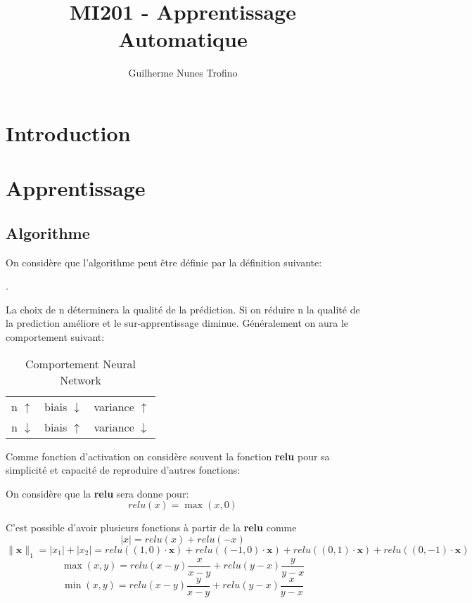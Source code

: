 \documentclass{article}
\title{MI201 - Apprentissage Automatique}
\author{Guilherme Nunes Trofino}
\begin{document}
\maketitle
\setlength{\parindent}{0pt}

\newpage\tableofcontents

\section{Introduction}


\section{Apprentissage}
\subsection{Algorithme}
On considère que l'algorithme peut être définie par la définition suivante:
\begin{definition}
    .
\end{definition}

La choix de n déterminera la qualité de la prédiction. Si on réduire n la qualité de la prediction améliore et le sur-apprentissage diminue. Généralement on aura le comportement suivant:
\begin{table}[H]
    \centering\begin{tabular}{lll}
        n $\uparrow$   & biais $\downarrow$ & variance $\uparrow$\\
        n $\downarrow$ & biais $\uparrow  $ & variance $\downarrow$\\
    \end{tabular}
    \caption{Comportement Neural Network}
\end{table}

Comme fonction d'activation on considère souvent la fonction \textbf{relu} pour sa simplicité et capacité de reproduire d'autres fonctions:
\begin{definition}
    On considère que la \textbf{relu} sera donne pour:
    \begin{equation}
        \boxed{
            relu(x) = \max(x, 0)
        }
    \end{equation}
\end{definition}
C'est possible d'avoir plusieurs fonctions à partir de la \textbf{relu} comme 
\begin{equation}
    |x| = relu(x) + relu(-x)
\end{equation}
\begin{equation}
    \| \mathbf{x}  \|_{1} = |x_{1}| + |x_{2}| = 
    relu((1,0)\cdot\mathbf{x}) + relu((-1,0)\cdot\mathbf{x}) + 
    relu((0,1)\cdot\mathbf{x}) + relu((0,-1)\cdot\mathbf{x})
\end{equation}
\begin{equation}
    \max(x, y) = relu(x-y)\frac{x}{x-y} + relu(y-x)\frac{y}{y-x}
\end{equation}
\begin{equation}
    \min(x, y) = relu(x-y)\frac{y}{x-y} + relu(y-x)\frac{x}{y-x}
\end{equation}
\end{document}
